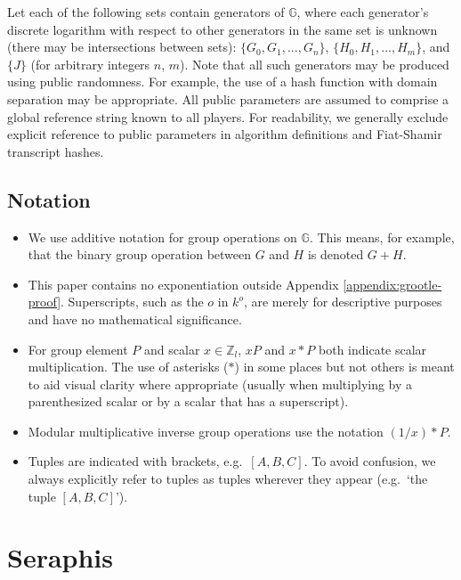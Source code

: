Let each of the following sets contain generators of $\mathbb{G}$, where each generator's discrete logarithm with respect to other generators in the same set is unknown (there may be intersections between sets): $\{G_0, G_1,...,G_n\}$, $\{H_0, H_1,...,H_m\}$, and $\{J\}$ (for arbitrary integers $n$, $m$). Note that all such generators may be produced using public randomness. For example, the use of a hash function with domain separation may be appropriate. All public parameters are assumed to comprise a global reference string known to all players. For readability, we generally exclude explicit reference to public parameters in algorithm definitions and Fiat-Shamir transcript hashes.


\subsection{Notation}
\label{subsec:preliminaries-notation}

\begin{itemize}
    \item We use additive notation for group operations on $\mathbb{G}$. This means, for example, that the binary group operation between $G$ and $H$ is denoted $G + H$.

    \item This paper contains no exponentiation outside Appendix \ref{appendix:grootle-proof}. Superscripts, such as the $o$ in $k^o$, are merely for descriptive purposes and have no mathematical significance.

    \item For group element $P$ and scalar $x \in \mathbb{Z}_l$, $x P$ and $x*P$ both indicate scalar multiplication. The use of asterisks ($*$) in some places but not others is meant to aid visual clarity where appropriate (usually when multiplying by a parenthesized scalar or by a scalar that has a superscript).

    \item Modular multiplicative inverse group operations use the notation $(1/x)*P$.

    \item Tuples are indicated with brackets, e.g.\ $[A, B, C]$. To avoid confusion, we always explicitly refer to tuples as tuples wherever they appear (e.g.\ `the tuple $[A, B, C]$').
\end{itemize}



\section{Seraphis}
\label{sec:seraphis}

